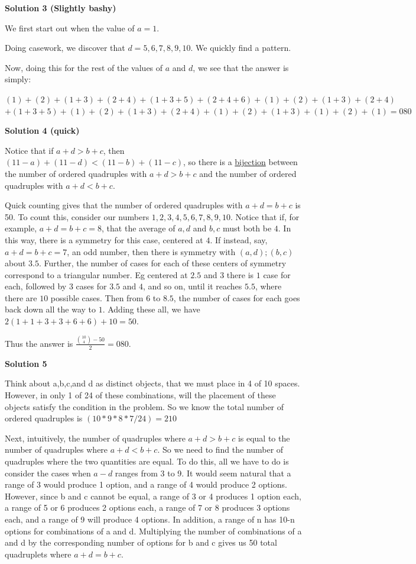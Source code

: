 \begin{enumerate}
 



\textbf{Solution 3 (Slightly bashy)}

We first start out when the value of $a=1$. 

 Doing casework, we discover that $d=5,6,7,8,9,10$. We quickly find a pattern.

 Now, doing this for the rest of the values of $a$ and $d$, we see that the answer is simply:

 
$(1)+(2)+(1+3)+(2+4)+(1+3+5)+(2+4+6)+(1)+(2)+(1+3)+(2+4)$$+(1+3+5)+(1)+(2)+(1+3)+(2+4)+(1)+(2)+(1+3)+(1)+(2)+(1)=\boxed{080}$




\textbf{Solution 4 (quick)}

Notice that if $a+d>b+c$, then $(11-a)+(11-d)<(11-b)+(11-c)$, so there is a \href{https://artofproblemsolving.com/wiki/index.php?title=Bijection}{bijection} between the number of ordered quadruples with $a+d>b+c$ and the number of ordered quadruples with $a+d<b+c$. 

 Quick counting gives that the number of ordered quadruples with $a+d=b+c$ is 50. To count this, consider our numbers $1, 2, 3, 4, 5, 6, 7, 8, 9, 10$. Notice that if, for example, $a+d=b+c=8$, that the average of $a,d$ and $b,c$ must both be $4$. In this way, there is a symmetry for this case, centered at $4$. If instead, say, $a+d=b+c=7$, an odd number, then there is symmetry with $(a,d);(b,c)$ about $3.5$. Further, the number of cases for each of these centers of symmetry correspond to a triangular number. Eg centered at $2.5$ and $3$ there is $1$ case for each, followed by $3$ cases for $3.5$ and $4$, and so on, until it reaches $5.5$, where there are $10$ possible cases. Then from $6$ to $8.5$, the number of cases for each goes back down all the way to $1$. Adding these all, we have $2(1+1+3+3+6+6)+10=50$.

 Thus the answer is $\frac{\binom{10}{4}-50}{2} = \boxed{080}.$




\textbf{Solution 5}

Think about a,b,c,and d as distinct objects, that we must place in 4 of 10 spaces. However, in only 1 of 24 of these combinations, will the placement of these objects satisfy the condition in the problem. So we know the total number of ordered quadruples is $(10*9*8*7/24)=210$ 

 Next, intuitively, the number of quadruples where $a+d>b+c$ is equal to the number of quadruples where $a+d<b+c$. So we need to find the number of quadruples where the two quantities are equal. To do this, all we have to do is consider the cases when $a-d$ ranges from 3 to 9. It would seem natural that a range of 3 would produce 1 option, and a range of 4 would produce 2 options. However, since b and c cannot be equal, a range of 3 or 4 produces 1 option each, a range of 5 or 6 produces 2 options each, a range of 7 or 8 produces 3 options each, and a range of 9 will produce 4 options. In addition, a range of n has 10-n options for combinations of a and d. Multiplying the number of combinations of a and d by the corresponding number of options for b and c gives us 50 total quadruplets where $a+d=b+c$. 


\end{enumerate}

